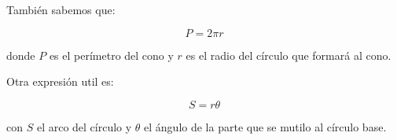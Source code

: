 También sabemos que:

\begin{equation}
    P = 2 \pi r
    \label{Perimetro}
\end{equation}

donde $P$ es el perímetro del cono y $r$
es el radio del círculo que formará al cono.

Otra expresión util es:

\begin{equation}
    S = r \theta
    \label{Arco}
\end{equation}

con $S$ el arco del círculo y $\theta$ el ángulo
de la parte que se mutilo al círculo base.
